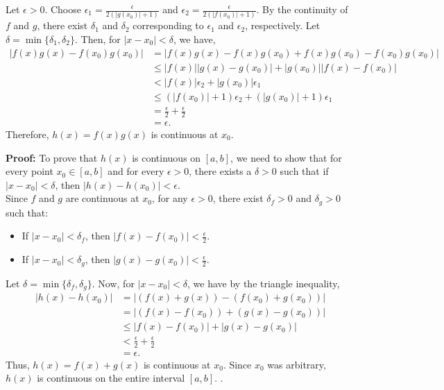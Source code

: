 Let \(\epsilon > 0\). Choose \(\displaystyle \epsilon_1 = \frac{\epsilon}{2(|g(x_0)|+1)}\) and \(\displaystyle \epsilon_2 = \frac{\epsilon}{2(|f(x_0)|+1)}\). By the continuity of \(f\) and \(g\), there exist \(\delta_1\) and \(\delta_2\) corresponding to \(\epsilon_1\) and \(\epsilon_2\), respectively. Let \(\delta = \min\{\delta_1, \delta_2\}\). Then, for \(|x - x_0| < \delta\), we have,
\begin{align*}
|f(x)g(x) - f(x_0)g(x_0)| &= |f(x)g(x) - f(x)g(x_0) + f(x)g(x_0) - f(x_0)g(x_0)| \\
&\leq |f(x)||g(x) - g(x_0)| + |g(x_0)||f(x) - f(x_0)| \\
&< |f(x)|\epsilon_2 + |g(x_0)|\epsilon_1 \\
&\leq (|f(x_0)|+1)\epsilon_2 + (|g(x_0)|+1)\epsilon_1 \\
&= \frac{\epsilon}{2} + \frac{\epsilon}{2} \\
&= \epsilon.
\end{align*}
Therefore, \(h(x) = f(x)g(x)\) is continuous at \(x_0\). 
\Qed
\bigskip


\textbf{Proof:} To prove that \(h(x)\) is continuous on \([a, b]\), we need to show that for every point \(x_0 \in [a, b]\) and for every \(\epsilon > 0\), there exists a \(\delta > 0\) such that if \(|x - x_0| < \delta\), then \(|h(x) - h(x_0)| < \epsilon\).\\

Since \(f\) and \(g\) are continuous at \(x_0\), for any \(\epsilon > 0\), there exist \(\delta_f > 0\) and \(\delta_g > 0\) such that:
\begin{itemize}
    \item If \(|x - x_0| < \delta_f\), then \(|f(x) - f(x_0)| < \frac{\epsilon}{2}\).
    \item If \(|x - x_0| < \delta_g\), then \(|g(x) - g(x_0)| < \frac{\epsilon}{2}\).
\end{itemize}

Let \(\delta = \min\{\delta_f, \delta_g\}\). Now, for \(|x - x_0| < \delta\), we have by the triangle inequality,
\begin{align*}
|h(x) - h(x_0)| &= |(f(x) + g(x)) - (f(x_0) + g(x_0))| \\
&= |(f(x) - f(x_0)) + (g(x) - g(x_0))| \\
&\leq |f(x) - f(x_0)| + |g(x) - g(x_0)| \\
&< \frac{\epsilon}{2} + \frac{\epsilon}{2} \\
&= \epsilon.
\end{align*}
Thus, \(h(x) = f(x) + g(x)\) is continuous at \(x_0\). Since \(x_0\) was arbitrary, \(h(x)\) is continuous on the entire interval \([a, b]\). 
\Qed.

